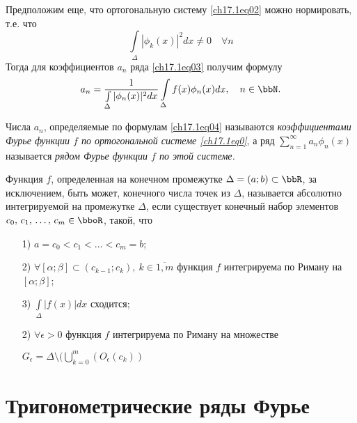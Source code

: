 Предположим еще, что ортогональную систему \eqref{ch17.1eq02} можно нормировать, т.е. что
$$
\int \limits_\Delta|\phi_k(x)|^2dx\ne 0 \quad \forall n
$$
Тогда для коэффициентов $a_n$ ряда \eqref{ch17.1eq03} получим формулу
\begin{equation} \label{ch17.1eq04}
a_n= \frac{1}{\int \limits_\Delta|\phi_n(x)|^2dx} \int \limits_\Delta f(x)\phi_n(x)dx, \quad n\in \bbN.
\end{equation}

\begin{defn}
Числа $a_n$, определяемые по формулам \eqref{ch17.1eq04} называются \textit{коэффициентами Фурье функции $f$ по ортогональной системе \eqref{ch17.1eq0}}, а ряд $\sum\limits_{n = 1}^{\infty} a_n \phi_n(x)$ называется \textit{рядом Фурье функции $f$ по этой системе.} 	
\end{defn}

\begin{defn} 
Функция $f$, определенная на конечном промежутке $\Delta=(a;b)\subset \bbR$, за исключением, быть может, конечного числа точек из $\Delta$, называется абсолютно интегрируемой на промежутке $\Delta$, если существует конечный набор элементов $c_0, \,c_1,\,\ldots,\,c_m \in \bboR$, такой, что
\begin{enumerate}

\item[1)]	
$a=c_0<c_1<\ldots<c_m=b$;
\item[2)]
$\forall [\alpha;\beta]\subset(c_{k-1};c_k),\ k\in \overline{1,m}$ функция $f$ интегрируема по Риману на $[\alpha;\beta]$;	
\item[3)]
$\int \limits_\Delta |f(x)|dx$ сходится;
\item[2)]
$ \forall\epsilon>0$ функция $f$ интегрируема по Риману на множестве 

$G_{\epsilon}=\Delta \setminus (\bigcup \limits_{k=0}^{m}(O_{\epsilon}(c_k))$
\end{enumerate}	
\end{defn}
\section{Тригонометрические ряды Фурье}	
	
